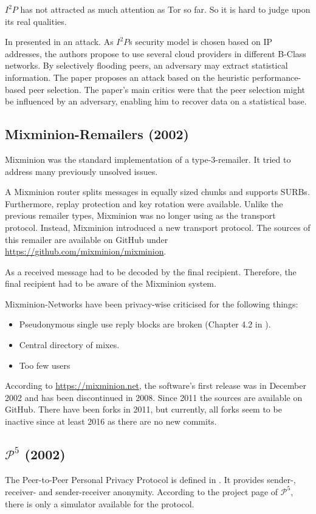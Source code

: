 $I^2P$ has not attracted as much attention as Tor so far. So it is hard to judge upon its real qualities.

In \citeyear{pets2011-i2p} \citeauthor{pets2011-i2p} presented in \cite{pets2011-i2p} an attack. As $I^2P$s security model is chosen based on IP addresses, the authors propose to use several cloud providers in different B-Class networks. By selectively flooding peers, an adversary may extract statistical information. The paper proposes an attack based on the heuristic performance-based peer selection. The paper's main critics were that the peer selection might be influenced by an adversary, enabling him to recover data on a statistical base.

\subsection{Mixminion-Remailers (2002)\label{sec:remMixminion}}
Mixminion was the standard implementation of a type-3-remailer. It tried to address many previously unsolved issues. 

A Mixminion router splits messages in equally sized chunks and supports SURBs. Furthermore,  replay protection and key rotation were available. Unlike the previous remailer types, Mixminion was no longer using  as the transport protocol. Instead, Mixminion introduced a new transport protocol. The sources of this remailer are available on GitHub under \url{https://github.com/mixminion/mixminion}.

As a received message had to be decoded by the final recipient. Therefore, the final recipient had to be aware of the Mixminion system.

Mixminion-Networks have been privacy-wise criticised for the following things: 
\begin{itemize}
	\item Pseudonymous single use reply blocks are broken (Chapter 4.2 in \cite{sassamanpynchon}).
	\item Central directory of mixes.
	\item Too few users
\end{itemize}

According to \url{https://mixminion.net}, the software's first release was in December 2002 and has been discontinued in 2008. Since 2011 the sources are available on GitHub. There have been forks in 2011, but currently, all forks seem to be inactive since at least 2016 as there are no new commits.

\subsection{\texorpdfstring{$\mathcal{P}^5$}{P5} (2002)}
The Peer-to-Peer Personal Privacy Protocol is defined in \cite{sherwood-protocol}. It provides sender-, receiver- and sender-receiver anonymity. According to the project page of $\mathcal{P}^5$, there is only a simulator available for the protocol.

